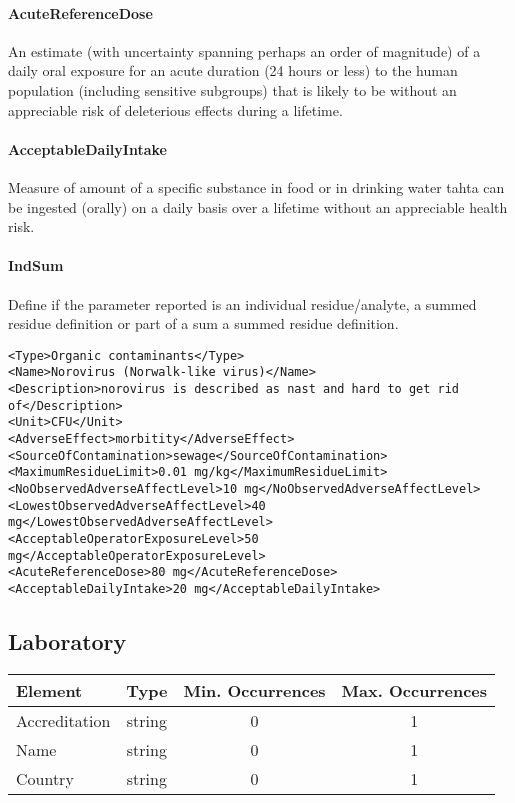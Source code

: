 \documentclass[a4paper]{report}
\begin{document}
\paragraph{AcuteReferenceDose}
An estimate (with uncertainty spanning perhaps an order of magnitude) of a daily oral exposure for an acute duration (24 hours or less) to the human population (including sensitive subgroups) that is likely to be without an appreciable risk of deleterious effects during a lifetime.

\paragraph{AcceptableDailyIntake}
Measure of amount of a specific substance in food or in drinking water tahta can be ingested (orally) on a daily basis over a lifetime without an appreciable health risk.

\paragraph{IndSum}
Define if the parameter reported is an individual residue/analyte, a summed residue definition or part of a sum a summed residue definition.

\begin{lstlisting}[basicstyle=\footnotesize, caption={Example of Hazard}]
<Type>Organic contaminants</Type>
<Name>Norovirus (Norwalk-like virus)</Name>
<Description>norovirus is described as nast and hard to get rid
of</Description>
<Unit>CFU</Unit>
<AdverseEffect>morbitity</AdverseEffect>
<SourceOfContamination>sewage</SourceOfContamination>
<MaximumResidueLimit>0.01 mg/kg</MaximumResidueLimit>
<NoObservedAdverseAffectLevel>10 mg</NoObservedAdverseAffectLevel>
<LowestObservedAdverseAffectLevel>40 mg</LowestObservedAdverseAffectLevel>
<AcceptableOperatorExposureLevel>50 mg</AcceptableOperatorExposureLevel>
<AcuteReferenceDose>80 mg</AcuteReferenceDose>
<AcceptableDailyIntake>20 mg</AcceptableDailyIntake>
\end{lstlisting}

\subsection{Laboratory}

\begin{tabular}{|l|c|c|c|}
    \hline
    \textbf{Element} & \textbf{Type} & \textbf{Min. Occurrences} & \textbf{Max. Occurrences} \\
    \hline
    Accreditation & string & 0 & 1 \\
    Name & string & 0 & 1 \\
    Country & string & 0 & 1 \\
    \hline
\end{tabular}
\end{document}
